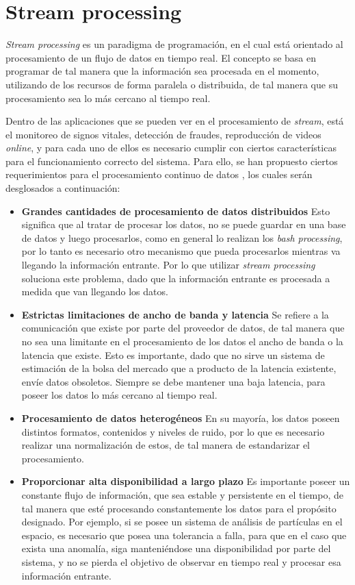 \section{Stream processing}
\label{sec:streamProcessing}

\textit{Stream processing} es un paradigma de programación, en el cual está orientado al procesamiento de un flujo de datos en tiempo real. El concepto se basa en programar de tal manera que la información sea procesada en el momento, utilizando de los recursos de forma paralela o distribuida, de tal manera que su procesamiento sea lo más cercano al tiempo real.

Dentro de las aplicaciones que se pueden ver en el procesamiento de \textit{stream}, está el monitoreo de signos vitales, detección de fraudes, reproducción de videos \textit{online}, y para cada uno de ellos es necesario cumplir con ciertos características para el funcionamiento correcto del sistema. Para ello, se han propuesto ciertos requerimientos para el procesamiento continuo de datos \citep{andrade2014fundamentals}, los cuales serán desglosados a continuación:

\begin{itemize}
	\item \textbf{Grandes cantidades de procesamiento de datos distribuidos} 	Esto significa que al tratar de procesar los datos, no se puede guardar en una base de datos y luego procesarlos, como en general lo realizan los \textit{bash processing}, por lo tanto es necesario otro mecanismo que pueda procesarlos mientras va llegando la información entrante. Por lo que utilizar \textit{stream processing} soluciona este problema, dado que la información entrante es procesada a medida que van llegando los datos.
	\item \textbf{Estrictas limitaciones de ancho de banda y latencia} Se refiere a la comunicación que existe por parte del proveedor de datos, de tal manera que no sea una limitante en el procesamiento de los datos el ancho de banda o la latencia que existe. Esto es importante, dado que no sirve un sistema de estimación de la bolsa del mercado que a producto de la latencia existente, envíe datos obsoletos. Siempre se debe mantener una baja latencia, para poseer los datos lo más cercano al tiempo real.
	\item \textbf{Procesamiento de datos heterogéneos} En su mayoría, los datos poseen distintos formatos, contenidos y niveles de ruido, por lo que es necesario realizar una normalización de estos, de tal manera de estandarizar el procesamiento.
	\item \textbf{Proporcionar alta disponibilidad a largo plazo} Es importante poseer un constante flujo de información, que sea estable y persistente en el tiempo, de tal manera que esté procesando constantemente los datos para el propósito designado. Por ejemplo, si se posee un sistema de análisis de partículas en el espacio, es necesario que posea una tolerancia a falla, para que en el caso que exista una anomalía, siga manteniéndose una disponibilidad por parte del sistema, y no se pierda el objetivo de observar en tiempo real y procesar esa información entrante.
\end{itemize}


